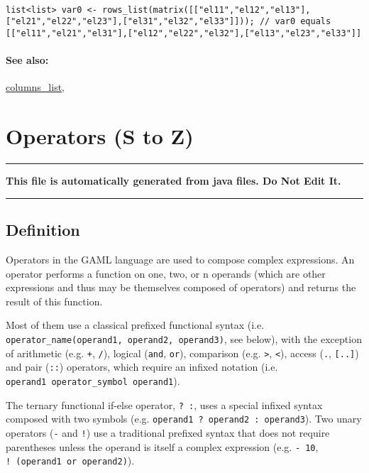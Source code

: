 \documentclass[]{book}
\theoremstyle{definition}
\theoremstyle{definition}
\theoremstyle{definition}
\theoremstyle{remark}
\begin{document}
\begin{verbatim}
 
list<list> var0 <- rows_list(matrix([["el11","el12","el13"],["el21","el22","el23"],["el31","el32","el33"]])); // var0 equals [["el11","el21","el31"],["el12","el22","el32"],["el13","el23","el33"]]
\end{verbatim}

\subsubsection{See also:}\label{see-also-182}

\href{OperatorsBC\#columns_list}{columns\_list},

\chapter{Operators (S to Z)}\label{operators-s-to-z}

\begin{center}\rule{0.5\linewidth}{\linethickness}\end{center}

\textbf{This file is automatically generated from java files. Do Not
Edit It.}

\begin{center}\rule{0.5\linewidth}{\linethickness}\end{center}

\section{Definition}\label{definition-5}

Operators in the GAML language are used to compose complex expressions.
An operator performs a function on one, two, or n operands (which are
other expressions and thus may be themselves composed of operators) and
returns the result of this function.

Most of them use a classical prefixed functional syntax (i.e.
\texttt{operator\_name(operand1,\ operand2,\ operand3)}, see below),
with the exception of arithmetic (e.g. \texttt{+}, \texttt{/}), logical
(\texttt{and}, \texttt{or}), comparison (e.g. \texttt{\textgreater{}},
\texttt{\textless{}}), access (\texttt{.}, \texttt{{[}..{]}}) and pair
(\texttt{::}) operators, which require an infixed notation (i.e.
\texttt{operand1\ operator\_symbol\ operand1}).

The ternary functional if-else operator, \texttt{?\ :}, uses a special
infixed syntax composed with two symbols (e.g.
\texttt{operand1\ ?\ operand2\ :\ operand3}). Two unary operators
(\texttt{-} and \texttt{!}) use a traditional prefixed syntax that does
not require parentheses unless the operand is itself a complex
expression (e.g. \texttt{-\ 10}, \texttt{!\ (operand1\ or\ operand2)}).
\end{document}
